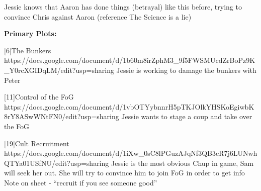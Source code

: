 \documentclass[char]{GL2020}
\begin{document}
\name{\cChupSecond{}}


Jessie knows that Aaron has done things (betrayal) like this before, trying to convince Chris against Aaron (reference The Science is a lie)








\textbf{Primary Plots:}

[6]The Bunkers https://docs.google.com/document/d/1b60m8irZphM3_9f5FWSMUcdZrBoPz9K_Y0rcXGIDqLM/edit?usp=sharing
Jessie is working to damage the bunkers with Peter

[11]Control of the FoG https://docs.google.com/document/d/1vbOTYybnnrH5pTKJOlkYHSKoEgiwbK8rY8ASwWNtFN0/edit?usp=sharing
Jessie wants to stage a coup and take over the FoG

[19]Cult Recruitment https://docs.google.com/document/d/1iXw_0sC8lPGuzAJqNf3QB3cR7j6LUNwhQTYa01USfNU/edit?usp=sharing
Jessie is the most obvious Chup in game, Sam will seek her out.  She will try to convince him to join FoG in order to get info
Note on sheet - "`recruit if you see someone good"'
\end{document}

